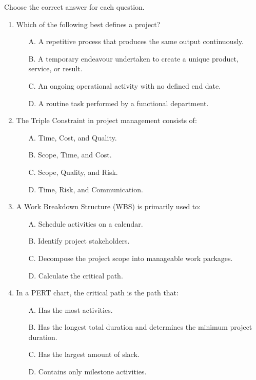 \documentclass[11pt]{article}
\begin{document}
\begin{exercice}
Choose the correct answer for each question.
\begin{enumerate}
    \item Which of the following best defines a project?
    \begin{itemize}
        \item[A.] A repetitive process that produces the same output continuously.
        \item[B.] A temporary endeavour undertaken to create a unique product, service, or result.
        \item[C.] An ongoing operational activity with no defined end date.
        \item[D.] A routine task performed by a functional department.
    \end{itemize}
    \item The Triple Constraint in project management consists of:
    \begin{itemize}
        \item[A.] Time, Cost, and Quality.
        \item[B.] Scope, Time, and Cost.
        \item[C.] Scope, Quality, and Risk.
        \item[D.] Time, Risk, and Communication.
    \end{itemize}
    \item A Work Breakdown Structure (WBS) is primarily used to:
    \begin{itemize}
        \item[A.] Schedule activities on a calendar.
        \item[B.] Identify project stakeholders.
        \item[C.] Decompose the project scope into manageable work packages.
        \item[D.] Calculate the critical path.
    \end{itemize}
    \item In a PERT chart, the critical path is the path that:
    \begin{itemize}
        \item[A.] Has the most activities.
        \item[B.] Has the longest total duration and determines the minimum project duration.
        \item[C.] Has the largest amount of slack.
        \item[D.] Contains only milestone activities.
    \end{itemize}
\end{enumerate}
\end{exercice}
\end{document}
